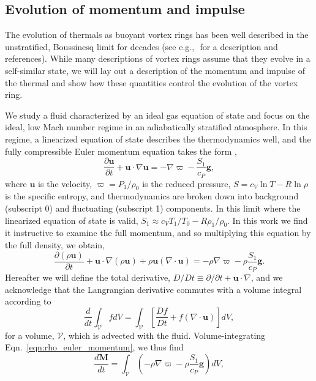 \documentclass[twocolumn, amsmath, amsfonts, amssymb, trackchanges]{aastex62}
\newcommand{\DivU}{\ensuremath{\nabla\cdot\bm{u}}}
\newcommand{\grad}{\ensuremath{\nabla}}
\newcommand{\LJ}{\citetalias{lecoanet&jeevanjee2018}}
\begin{document}
\subsection{Evolution of momentum and impulse}
The evolution of thermals as buoyant vortex rings has been well described in the unstratified, Boussinesq limit for decades (see e.g.,~\LJ\,for a description and references).
While many descriptions of vortex rings assume that they evolve in a self-similar state, we will lay out a description of the momentum and impulse of the thermal and show how these quantities control the evolution of the vortex ring.

We study a fluid characterized by an ideal gas equation of state and focus on the ideal, low Mach number regime in an adiabatically stratified atmosphere. 
In this regime, a linearized equation of state describes the thermodynamics well, and the fully compressible Euler momentum equation takes the form \citep{brown&all2012},
\begin{equation}
\frac{\partial \bm{u}}{\partial t} + \bm{u}\cdot\grad\bm{u} = 
-\grad\varpi - \frac{S_1}{c_P}\bm{g},
\label{eqn:euler_momentum}
\end{equation}
where $\bm{u}$ is the velocity, $\varpi = P_1 / \rho_0$ is the reduced pressure, $S = c_V\ln T - R\ln\rho$ is the specific entropy, and thermodynamics are broken down into background (subscript 0) and fluctuating (subscript 1) components.
In this limit where the linearized equation of state is valid, $S_1 \approx c_V T_1/T_0 - R \rho_1/\rho_0$.
In this work we find it instructive to examine the full momentum, and so multiplying this equation by the full density, we obtain,
\begin{equation}
\frac{\partial (\rho\bm{u})}{\partial t} + \bm{u}\cdot\grad(\rho\bm{u}) + \rho\bm{u}(\DivU)
= -\rho\grad\varpi - \rho\frac{S_1}{c_P}\bm{g}.
\label{eqn:rho_euler_momentum}
\end{equation}
Hereafter we will define the total derivative, $D/Dt \equiv \partial/\partial t + \bm{u}\cdot\grad$, and we acknowledge that the Langrangian derivative commutes with a volume integral according to 
\begin{equation*}
\frac{d}{dt}\int_{\mathcal{V}} f dV = \int_{\mathcal{V}} \left[\frac{Df}{Dt} + f(\DivU)\right]dV,
\end{equation*}
for a volume, $\mathcal{V}$, which is advected with the fluid.
Volume-integrating Eqn.~\ref{eqn:rho_euler_momentum}, we thus find
\begin{equation}
\frac{d\bm{M}}{dt} = \int_{\mathcal{V}}\left(-\rho\grad\varpi - \rho\frac{S_1}{c_P}\bm{g}\right)dV,
\label{eqn:int_momentum_eqn}
\end{equation}
\end{document}
